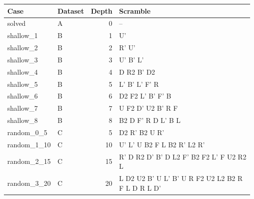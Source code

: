 \begin{tabular}{p{}lrp{}}
\hline
Case & Dataset & Depth & Scramble \\
\hline
solved & A & 0 & -- \\
shallow\_1 & B & 1 & U' \\
shallow\_2 & B & 2 & R' U' \\
shallow\_3 & B & 3 & U' B' L' \\
shallow\_4 & B & 4 & D R2 B' D2 \\
shallow\_5 & B & 5 & L' B' L' F' R \\
shallow\_6 & B & 6 & D2 F2 L' B' F' B \\
shallow\_7 & B & 7 & U F2 D' U2 B' R F \\
shallow\_8 & B & 8 & B2 D F' R D L' B L \\
random\_0\_5 & C & 5 & D2 R' B2 U R' \\
random\_1\_10 & C & 10 & U' L' U B2 F L B2 R' L2 R' \\
random\_2\_15 & C & 15 & R' D R2 D' B' D L2 F' B2 F2 L' F U2 R2 L \\
random\_3\_20 & C & 20 & L D2 U2 B' U L' B' U R F2 U2 L2 B2 R F L D R L D' \\
\hline
\end{tabular}
